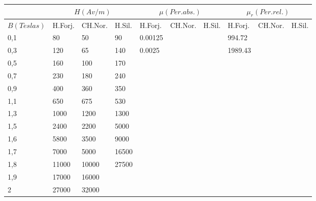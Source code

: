 \documentclass[../main]{subfiles}
\begin{document}
\begin{enumerate}

    \begin{table}[ht]
      \begin{center}
        \footnotesize
        \begin{tabular}[c]{|l|l|l|l|p{1cm}|p{1cm}|p{1cm}|p{1cm}|p{1cm}|p{1cm}|}
          \hline
          & \multicolumn{3}{|c|}{$H(Av/m)$}
          &\multicolumn{3}{|c|}{$\mu (Per.abs.)$}
          &\multicolumn{3}{|c|}{$\mu_r (Per.rel.)$}  \\
          \hline
          {$B(Teslas)$} &H.Forj.& CH.Nor. & H.Sil.&H.Forj.& CH.Nor. &
          H.Sil.&H.Forj.& CH.Nor. & H.Sil.  \\
          \hline
          0,1 & 80 & 50 & 90 &0.00125 & & &994.72 & & \\ \hline
          0,3 & 120 & 65&140 &0.0025 & & &1989.43 & &\\\hline
          0,5&160&100&170& & & & & &\\\hline
          0,7&230&180&240& & & & & &\\\hline
          0,9&400&360&350& & & & & &\\\hline
          1,1&650&675&530& & & & & &\\\hline
          1,3&1000&1200&1300& & & & & &\\\hline
          1,5&2400&2200&5000& & & & & &\\\hline
          1,6&5800&3500&9000& & & & & &\\\hline
          1,7&7000&5000&16500& & & & & &\\\hline
          1,8&11000&10000&27500& & & & & &\\\hline
          1,9&17000&16000& & & & & & &\\\hline
          2&27000&32000& & & & & & &\\ \hline
        \end{tabular}

\end{center}
\end{table}
\end{enumerate}
\end{document}
